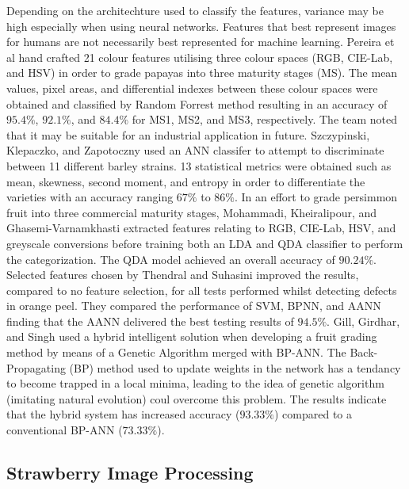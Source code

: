 \documentclass[fleqn,twoside]{article}
\begin{document}
Depending on the architechture used to classify the features, variance may be high especially when using neural networks. Features that best represent images for humans are not necessarily best represented for machine learning. Pereira et al \cite{pereira} hand crafted 21 colour features utilising three colour spaces (RGB, CIE-Lab, and HSV) in order to grade papayas into three maturity stages (MS). The mean values, pixel areas, and differential indexes between these colour spaces were obtained and classified by Random Forrest method resulting in an accuracy of $95.4\%$, $92.1\%$, and $84.4\%$ for MS1, MS2, and MS3, respectively. The team noted that it may be suitable for an industrial application in future. Szczypinski, Klepaczko, and Zapotoczny \cite{szczypinski} used an ANN classifer to attempt to discriminate between 11 different barley strains. 13 statistical metrics were obtained such as mean, skewness, second moment, and entropy in order to differentiate the varieties with an accuracy ranging $67\%$ to $86\%$. In an effort to grade persimmon fruit into three commercial maturity stages, Mohammadi, Kheiralipour, and Ghasemi-Varnamkhasti \cite{mohammadi} extracted features relating to RGB, CIE-Lab, HSV, and greyscale conversions before training both an LDA and QDA classifier to perform the categorization. The QDA model achieved an overall accuracy of $90.24\%$. Selected features chosen by Thendral and Suhasini \cite{thendral} improved the results, compared to no feature selection, for all tests performed whilst detecting defects in orange peel. They compared the performance of SVM, BPNN, and AANN finding that the AANN delivered the best testing results of $94.5\%$. Gill, Girdhar, and Singh \cite{gill} used a hybrid intelligent solution when developing a fruit grading method by means of a Genetic Algorithm merged with BP-ANN. The Back-Propagating (BP) method used to update weights in the network has a tendancy to become trapped in a local minima, leading to the idea of genetic algorithm (imitating natural evolution) coul overcome this problem. The results indicate that the hybrid system has increased accuracy ($93.33\%$) compared to a conventional BP-ANN ($73.33\%$).  









\subsection{Strawberry Image Processing}
\end{document}
